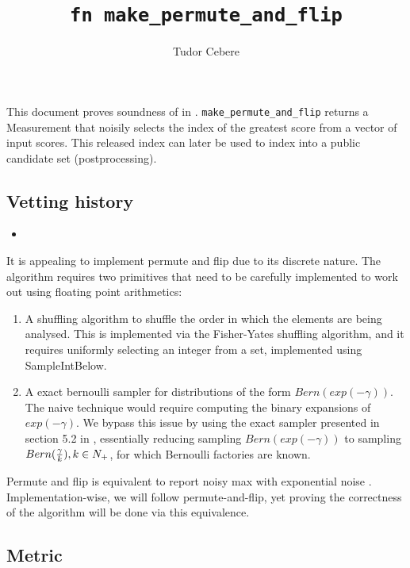 \documentclass{article} %
\title{\texttt{fn make\_permute\_and\_flip}}
\author{Tudor Cebere}\date{}
\begin{document}
\maketitle\contrib
This document proves soundness of  \cite{mckenna2020permute} in . \texttt{make\_permute\_and\_flip} returns a Measurement that noisily selects the index of the greatest score from a vector of input scores. This released index can later be used to index into a public candidate set (postprocessing).

\subsection*{Vetting history}
\begin{itemize}
    \item {}
\end{itemize}

It is appealing to implement permute and flip due to its discrete nature.
The algorithm requires two primitives that need to be carefully implemented to work out using floating point arithmetics:
\begin{enumerate}
    \item A shuffling algorithm to shuffle the order in which the elements are being analysed. This is implemented via the Fisher-Yates shuffling algorithm, and it requires uniformly selecting an integer from a set, implemented using SampleIntBelow.
    \item A exact bernoulli sampler for distributions of the form $Bern(exp(-\gamma))$. The naive technique would require computing the binary expansions of $exp(-\gamma)$. We bypass this issue by using the exact sampler presented in section 5.2 in \cite{canonne2020discrete}, essentially reducing sampling $Bern(exp(-\gamma))$ to sampling $Bern(\frac{\gamma}{k}), \\ k \in N_{+}$, for which Bernoulli factories are known.
\end{enumerate}

Permute and flip is equivalent to report noisy max with exponential noise \cite{ding2021permute}. Implementation-wise, we will follow permute-and-flip, yet proving the correctness of the algorithm will be done via this equivalence.
\subsection*{Metric}
\end{document}
